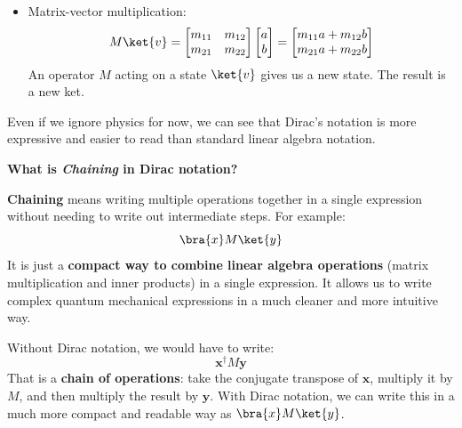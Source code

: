 \begin{itemize}
    \item Matrix-vector multiplication:
    \begin{equation}
        M \ket{v} = \begin{bmatrix}
            m_{11} & m_{12} \\ m_{21} & m_{22}
        \end{bmatrix}
        \begin{bmatrix}
            a \\ b
        \end{bmatrix}
        =
        \begin{bmatrix}
            m_{11}a + m_{12}b \\ m_{21}a + m_{22}b
        \end{bmatrix}
    \end{equation}
    An operator $M$ acting on a state $\ket{v}$ gives us a new state. The result is a new ket.
\end{itemize}
Even if we ignore physics for now, we can see that Dirac's notation is more expressive and easier to read than standard linear algebra notation.

\highspace
\begin{flushleft}
    \textcolor{Green3}{ \textbf{What is \emph{Chaining} in Dirac notation?}}
\end{flushleft}
\textbf{Chaining} means writing multiple operations together in a single expression without needing to write out intermediate steps. For example:
\begin{equation*}
    \bra{x} M \ket{y}
\end{equation*}
It is just a \textbf{compact way to combine linear algebra operations} (matrix multiplication and inner products) in a single expression. It allows us to write complex quantum mechanical expressions in a much cleaner and more intuitive way.

\highspace
Without Dirac notation, we would have to write:
\begin{equation*}
    \mathbf{x}^{\dagger} M \mathbf{y}
\end{equation*}
That is a \textbf{chain of operations}: take the conjugate transpose of $\mathbf{x}$, multiply it by $M$, and then multiply the result by $\mathbf{y}$. With Dirac notation, we can write this in a much more compact and readable way as $\bra{x} M \ket{y}$.

